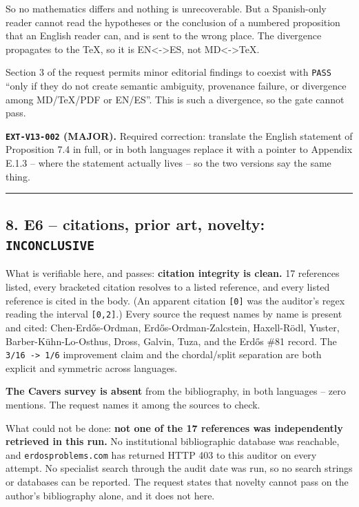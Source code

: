\documentclass[
  10pt,
]{article}
\begin{document}
So no mathematics differs and nothing is unrecoverable. But a
Spanish-only reader cannot read the hypotheses or the conclusion of a
numbered proposition that an English reader can, and is sent to the
wrong place. The divergence propagates to the TeX, so it is
EN\textless-\textgreater ES, not MD\textless-\textgreater TeX.

Section 3 of the request permits minor editorial findings to coexist
with \texttt{PASS} ``only if they do not create semantic ambiguity,
provenance failure, or divergence among MD/TeX/PDF or EN/ES''. This is
such a divergence, so the gate cannot pass.

\textbf{\texttt{EXT-V13-002} (MAJOR).} Required correction: translate
the English statement of Proposition 7.4 in full, or in both languages
replace it with a pointer to Appendix E.1.3 -- where the statement
actually lives -- so the two versions say the same thing.

\begin{center}\rule{0.5\linewidth}{0.5pt}\end{center}

\subsection{\texorpdfstring{8. E6 -- citations, prior art, novelty:
\texttt{INCONCLUSIVE}}{8. E6 -- citations, prior art, novelty: INCONCLUSIVE}}\label{e6-citations-prior-art-novelty-inconclusive}

What is verifiable here, and passes: \textbf{citation integrity is
clean.} 17 references listed, every bracketed citation resolves to a
listed reference, and every listed reference is cited in the body. (An
apparent citation \texttt{{[}0{]}} was the auditor's regex reading the
interval \texttt{{[}0,2{]}}.) Every source the request names by name is
present and cited: Chen-Erdős-Ordman, Erdős-Ordman-Zalcstein,
Haxell-Rödl, Yuster, Barber-Kühn-Lo-Osthus, Dross, Galvin, Tuza, and the
Erdős \#81 record. The \texttt{3/16\ -\textgreater{}\ 1/6} improvement
claim and the chordal/split separation are both explicit and symmetric
across languages.

\textbf{The Cavers survey is absent} from the bibliography, in both
languages -- zero mentions. The request names it among the sources to
check.

What could not be done: \textbf{not one of the 17 references was
independently retrieved in this run.} No institutional bibliographic
database was reachable, and \texttt{erdosproblems.com} has returned HTTP
403 to this auditor on every attempt. No specialist search through the
audit date was run, so no search strings or databases can be reported.
The request states that novelty cannot pass on the author's bibliography
alone, and it does not here.
\end{document}
